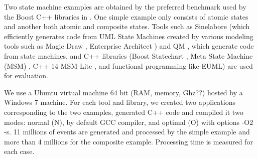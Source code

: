 \noindent
{} 



\noindent
{} Two state machine examples are obtained by the preferred benchmark used by the Boost C++ libraries \cite{boost} in \cite{benchmark}. One simple example \cite{simpleexample} only consists of atomic states and another \cite{compositeexample} both atomic and composite states. 
Tools such as Sinelabore (which efficiently generates code from UML State Machines created by various modeling tools such as Magic Draw \cite{Magicdraw}, Enterprise Architect \cite{EA}) and QM \cite{QM}, which generate code from state machines, and C++ libraries (Boost Statechart \cite{Statechart}, Meta State Machine (MSM) \cite{MSM}, C++ 14 MSM-Lite \cite{benchmark}, and functional programming like-EUML\cite{EUML}) are used for evaluation. 

\noindent
{} We use a Ubuntu virtual machine 64 bit (RAM, memory, Ghz??) hosted by a Windows 7 machine. 
For each tool and library, we created two applications corresponding to the two examples, generated C++ code and compiled it two modes: normal (N), by default GCC compiler, and optimal (O) with options -O2 -s. 
11 millions of events are generated and processed by the simple example and more than 4 millions for the composite example. 
Processing time is measured for each case. 

